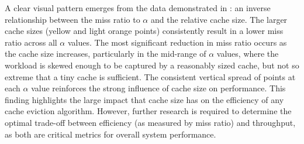A clear visual pattern emerges from the data demonstrated in : an inverse relationship between the miss ratio to $\alpha$ and the relative cache size. The larger cache sizes (yellow and light orange points) consistently result in a lower miss ratio across all $\alpha$ values. The most significant reduction in miss ratio occurs as the cache size increases, particularly in the mid-range of $\alpha$ values, where the workload is skewed enough to be captured by a reasonably sized cache, but not so extreme that a tiny cache is sufficient. The consistent vertical spread of points at each $\alpha$ value reinforces the strong influence of cache size on performance. This finding highlights the large impact that cache size has on the efficiency of any cache eviction algorithm. However, further research is required to determine the optimal trade-off between efficiency (as measured by miss ratio) and throughput, as both are critical metrics for overall system performance.